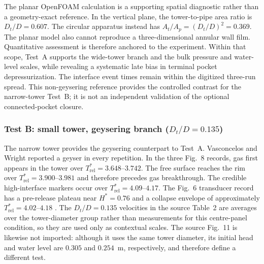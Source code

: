 The planar OpenFOAM calculation is a supporting spatial diagnostic rather than
a geometry-exact reference. In the vertical plane, the tower-to-pipe area
ratio is $D_t/D=0.607$. The circular apparatus instead has
$A_t/A_p=(D_t/D)^2=0.369$. The planar model also cannot reproduce a
three-dimensional annular wall film. Quantitative assessment is therefore
anchored to the experiment.
Within that scope, Test~A supports the wide-tower branch and the bulk pressure
and water-level scales, while revealing a systematic late bias in terminal
pocket depressurization. The interface event times remain within the digitized
three-run spread. This non-geysering reference provides the controlled contrast
for the narrow-tower Test~B; it is not an independent validation of the
optional connected-pocket closure.

\FloatBarrier

\subsubsection{Test B: small tower, geysering branch
($D_t/D=0.135$)}
\label{sec:tests:vw2011:caseB}

The narrow tower provides the geysering counterpart to Test~A. Vasconcelos and
Wright reported a geyser in every repetition. In the three Fig.~8 records, gas
first appears in the tower over $T_{\mathrm{rel}}^{*}=3.648$--$3.742$. The free
surface reaches the rim over $T_{\mathrm{rel}}^{*}=3.900$--$3.981$ and therefore
precedes gas breakthrough. The credible high-interface markers occur over
$T_{\mathrm{rel}}^{*}=4.09$--$4.17$. The Fig.~6 transducer record has a
pre-release plateau near $H^{*}=0.76$ and a collapse envelope of approximately
$T_{\mathrm{rel}}^{*}=4.02$--$4.18$ \cite{vasconcelos2011}.
The $D_t/D=0.135$ velocities in the source Table~2 are averages over the
tower-diameter group rather than measurements for this centre-panel condition,
so they are used only as contextual scales.  The source Fig.~11 is likewise
not imported: although it uses the same tower diameter, its initial head and
water level are $0.305$ and $0.254$~m, respectively, and therefore define a
different test.

